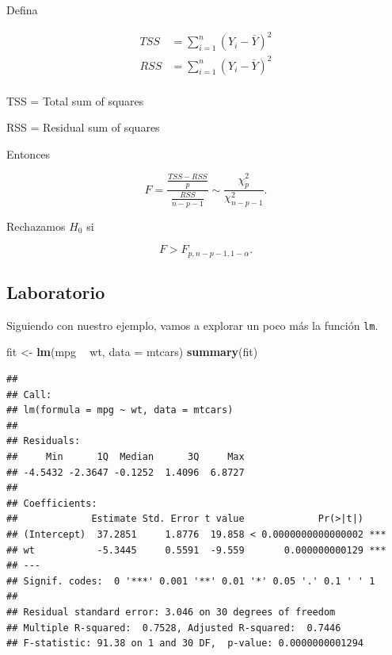 \documentclass[
  12pt,
]{book}
\newenvironment{Shaded}{\begin{snugshade}}{\end{snugshade}}
\newcommand{\DataTypeTok}[1]{\textcolor[rgb]{0.13,0.29,0.53}{#1}}
\newcommand{\KeywordTok}[1]{\textcolor[rgb]{0.13,0.29,0.53}{\textbf{#1}}}
\newcommand{\NormalTok}[1]{#1}
\newcommand{\OperatorTok}[1]{\textcolor[rgb]{0.81,0.36,0.00}{\textbf{#1}}}
\newcommand{\StringTok}[1]{\textcolor[rgb]{0.31,0.60,0.02}{#1}}
\theoremstyle{definition}
\theoremstyle{definition}
\theoremstyle{definition}
\theoremstyle{remark}
\begin{document}
Defina

\begin{align*}
 TSS &= \sum_{i=1}^{n} \left( Y_{i} -\overline{Y} \right)^{2} \\
 RSS &= \sum_{i=1}^{n} \left( Y_{i} -\overline{Y} \right)^{2} \\
 \end{align*}

TSS = Total sum of squares

RSS = Residual sum of squares

Entonces

\begin{equation*}
 F = \frac{\frac{TSS-RSS}{p}}{\frac{RSS}{n-p-1}} \sim \frac{\chi^{2}_{p}}{\chi^{2}_{n-p-1}}.
 \end{equation*}

Rechazamos \(H_{0}\) si

\begin{equation*}
 F > F_{p, n-p-1, 1-\alpha}.
 \end{equation*}

\hypertarget{laboratorio-2}{%
\subsection{Laboratorio}\label{laboratorio-2}}

Siguiendo con nuestro ejemplo, vamos a explorar un poco más la función \texttt{lm}.

\begin{Shaded}
\begin{Highlighting}[]
\NormalTok{fit <-}\StringTok{ }\KeywordTok{lm}\NormalTok{(mpg }\OperatorTok{~}\StringTok{ }\NormalTok{wt, }\DataTypeTok{data =}\NormalTok{ mtcars)}
\KeywordTok{summary}\NormalTok{(fit)}
\end{Highlighting}
\end{Shaded}

\begin{verbatim}
## 
## Call:
## lm(formula = mpg ~ wt, data = mtcars)
## 
## Residuals:
##     Min      1Q  Median      3Q     Max 
## -4.5432 -2.3647 -0.1252  1.4096  6.8727 
## 
## Coefficients:
##             Estimate Std. Error t value             Pr(>|t|)    
## (Intercept)  37.2851     1.8776  19.858 < 0.0000000000000002 ***
## wt           -5.3445     0.5591  -9.559       0.000000000129 ***
## ---
## Signif. codes:  0 '***' 0.001 '**' 0.01 '*' 0.05 '.' 0.1 ' ' 1
## 
## Residual standard error: 3.046 on 30 degrees of freedom
## Multiple R-squared:  0.7528, Adjusted R-squared:  0.7446 
## F-statistic: 91.38 on 1 and 30 DF,  p-value: 0.0000000001294
\end{verbatim}
\end{document}
